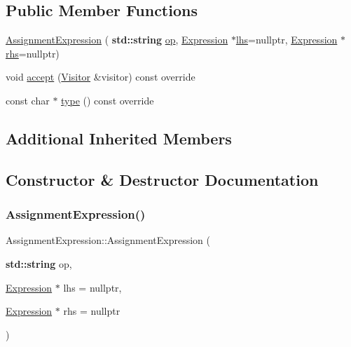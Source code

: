 \subsection*{Public Member Functions}
\begin{DoxyCompactItemize}
\item 
\hyperlink{struct_assignment_expression_a52c4ebecbb914085110db6fdef413ae6}{Assignment\+Expression} (\textbf{ std\+::string} \hyperlink{struct_binary_expression_a4c33b66e2ffc0a5ede2cdd190bf4bd75}{op}, \hyperlink{struct_expression}{Expression} $\ast$\hyperlink{struct_binary_expression_ae689284a646929c99e634e75f50cb32c}{lhs}=nullptr, \hyperlink{struct_expression}{Expression} $\ast$\hyperlink{struct_binary_expression_ad569ae3b07f428257b0e7a96746ceb32}{rhs}=nullptr)
\item 
void \hyperlink{struct_assignment_expression_ac3d1a00abf176502782937938f629a9f}{accept} (\hyperlink{struct_visitor}{Visitor} \&visitor) const override
\item 
const char $\ast$ \hyperlink{struct_assignment_expression_a9c5da03eec8d7c10f1127ec5029de263}{type} () const override
\end{DoxyCompactItemize}
\subsection*{Additional Inherited Members}


\subsection{Constructor \& Destructor Documentation}
\mbox{\label{struct_assignment_expression_a52c4ebecbb914085110db6fdef413ae6}} 
\subsubsection{\texorpdfstring{Assignment\+Expression()}{AssignmentExpression()}}
{\footnotesize\ttfamily Assignment\+Expression\+::\+Assignment\+Expression (\begin{DoxyParamCaption}\item[{\textbf{ std\+::string}}]{op,  }\item[{\hyperlink{struct_expression}{Expression} $\ast$}]{lhs = {\ttfamily nullptr},  }\item[{\hyperlink{struct_expression}{Expression} $\ast$}]{rhs = {\ttfamily nullptr} }\end{DoxyParamCaption})\hspace{0.3cm}{\ttfamily [inline]}}



